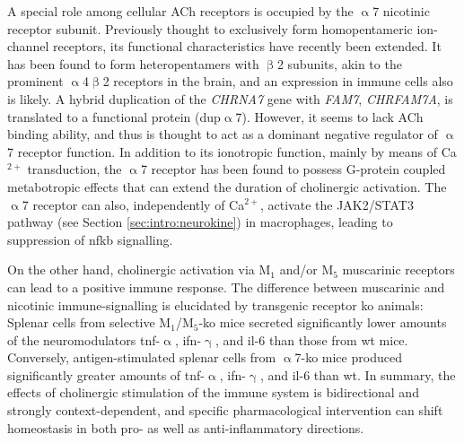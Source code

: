 A special role among cellular ACh receptors is occupied by the $\upalpha$7 nicotinic receptor subunit. Previously thought to exclusively form homopentameric ion-channel receptors, its functional characteristics have recently been extended. It has been found to form heteropentamers with $\upbeta$2 subunits, akin to the prominent $\upalpha$4$\upbeta$2 receptors in the brain, and an expression in immune cells also is likely. A hybrid duplication of the \emph{CHRNA7} gene with \emph{FAM7}, \emph{CHRFAM7A}, is translated to a functional protein (dup$\upalpha$7). However, it seems to lack ACh binding ability, and thus is thought to act as a dominant negative regulator of $\upalpha$7 receptor function. In addition to its ionotropic function, mainly by means of Ca$^{2+}$ transduction, the $\upalpha$7 receptor has been found to possess G-protein coupled metabotropic effects that can extend the duration of cholinergic activation. The $\upalpha$7 receptor can also, independently of Ca$^{2+}$, activate the JAK2/STAT3 pathway (see Section \ref{sec:intro:neurokine}) in macrophages, leading to suppression of \acs{nfkb} signalling.

On the other hand, cholinergic activation via M$_1$ and/or M$_5$ muscarinic receptors can lead to a positive immune response. The difference between muscarinic and nicotinic immune-signalling is elucidated by transgenic receptor \ac{ko} animals: Splenar cells from selective M$_1$/M$_5$-\ac{ko} mice secreted significantly lower amounts of the neuromodulators \ac{tnf}-$\upalpha$, \ac{ifn}-$\upgamma$, and \ac{il}-6 than those from \ac{wt} mice. Conversely, antigen-stimulated splenar cells from $\upalpha$7-\ac{ko} mice produced significantly greater amounts of \ac{tnf}-$\upalpha$, \ac{ifn}-$\upgamma$, and \ac{il}-6 than \ac{wt}. In summary, the effects of cholinergic stimulation of the immune system is bidirectional and strongly context-dependent, and specific pharmacological intervention can shift homeostasis in both pro- as well as anti-inflammatory directions.

